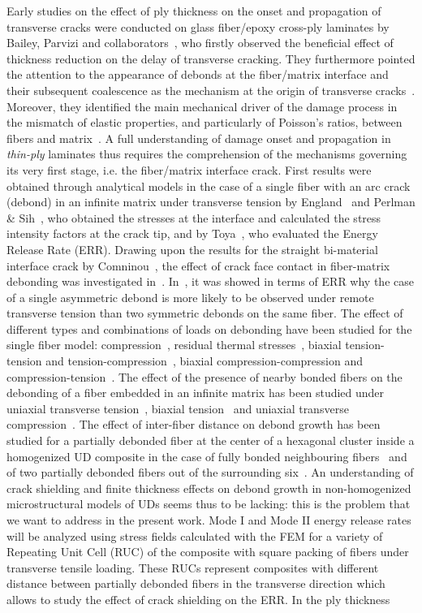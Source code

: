 \documentclass[review]{elsarticle}
\begin{document}
Early studies on the effect of ply thickness on the onset and propagation of transverse cracks were conducted on glass fiber/epoxy cross-ply laminates by Bailey, Parvizi and collaborators~\cite{Garrett1977,Parvizi1978a,Parvizi1978b}, who firstly observed the beneficial effect of thickness reduction on the delay of transverse cracking. They furthermore pointed the attention to the appearance of debonds at the fiber/matrix interface and their subsequent coalescence as the mechanism at the origin of transverse cracks~\cite{Bailey1981}. Moreover, they identified the main mechanical driver of the damage process in the mismatch of elastic properties, and particularly of Poisson's ratios, between fibers and matrix~\cite{Bailey1979}. A full understanding of damage onset and propagation in \emph{thin-ply} laminates thus requires the comprehension of the mechanisms governing its very first stage, i.e. the fiber/matrix interface crack. First results were obtained through analytical models in the case of a single fiber with an arc crack (debond) in an infinite matrix under transverse tension by England~\cite{England1966} and Perlman \& Sih~\cite{Perlman1967}, who obtained the stresses at the interface and calculated the stress intensity factors at the crack tip, and by Toya~\cite{Toya1974}, who evaluated the Energy Release Rate (ERR). Drawing upon the results for the straight bi-material interface crack by Comninou~\cite{Comninou1977}, the effect of crack face contact in fiber-matrix debonding was investigated in~\cite{Paris1996,Varna1997a}. In~\cite{Garcia2015}, it was showed in terms of ERR why the case of a single asymmetric debond is more likely to be observed under remote transverse tension than two symmetric debonds on the same fiber. The effect of different types and combinations of loads on debonding have been studied for the single fiber model: compression~\cite{Correa2007}, residual thermal stresses~\cite{Correa2011}, biaxial tension-tension and tension-compression~\cite{Correa2013}, biaxial compression-compression and compression-tension~\cite{Correa2014}. The effect of the presence of nearby bonded fibers on the debonding of a fiber embedded in an infinite matrix has been studied under uniaxial transverse tension~\cite{Sandino2016}, biaxial tension~\cite{Sandino2016b} and uniaxial transverse compression~\cite{Sandino2018}. The effect of inter-fiber distance on debond growth has been studied for a partially debonded fiber at the center of a hexagonal cluster inside a homogenized UD composite in the case of fully bonded neighbouring fibers~\cite{Zhuang2018} and of two partially debonded fibers out of the surrounding six~\cite{Varna2017}. An understanding of crack shielding and finite thickness effects on debond growth in non-homogenized microstructural models of UDs seems thus to be lacking: this is the problem that we want to address in the present work. Mode I and Mode II energy release rates will be analyzed using stress fields calculated with the FEM for a variety of Repeating Unit Cell (RUC) of the composite with square packing of fibers under transverse tensile loading. These RUCs represent composites with different distance between partially debonded fibers in the transverse direction which allows to study the effect of crack shielding on the ERR. In the ply thickness 
\end{document}
